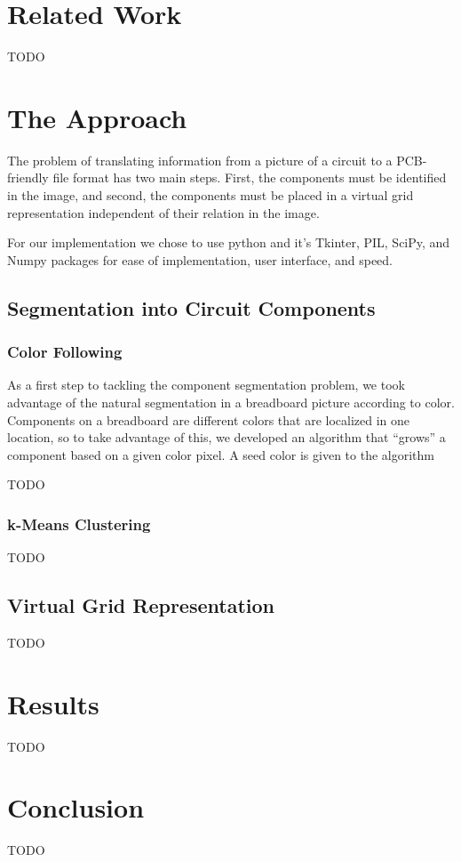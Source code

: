 \documentclass[10pt,twocolumn,letterpaper]{article}
\begin{document}
\section{Related Work}

TODO

\section{The Approach}

The problem of translating information from a picture of a circuit to a
PCB-friendly file format has two main steps. First, the components must be
identified in the image, and second, the components must be placed in a virtual
grid representation independent of their relation in the image. 

For our implementation we chose to use python and it's Tkinter, PIL, SciPy, and
Numpy packages for ease of implementation, user interface, and speed. 

\subsection{Segmentation into Circuit Components}

\subsubsection{Color Following}

As a first step to tackling the component segmentation problem, we took
advantage of the natural segmentation in a breadboard picture according to
color. Components on a breadboard are different colors that are localized in
one location, so to take advantage of this, we developed an algorithm that
``grows'' a component based on a given color pixel. A seed color is given to
the algorithm 

TODO 

\subsubsection{k-Means Clustering}

TODO

\subsection{Virtual Grid Representation}

TODO

\section{Results}

TODO

\section{Conclusion}

TODO

{\small


}
\end{document}
